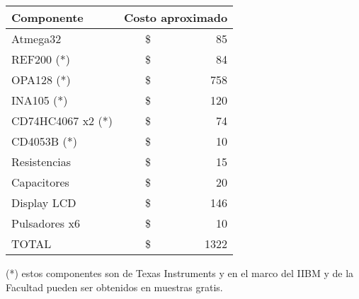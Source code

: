 \begin{table}[H]
\begin{center}
\begin{tabular}{|l|rr|}
    \hline
    \textbf{Componente} & \multicolumn{2}{c|}{\textbf{Costo aproximado}} \\ \hline
    Atmega32            & \hspace{2.8cm}\$ &   85 \\ \hline
    REF200 (*)          & \$               &   84 \\ \hline
    OPA128 (*)          & \$               &  758 \\ \hline
    INA105 (*)          & \$               &  120 \\ \hline
    CD74HC4067 x2 (*)   & \$               &   74 \\ \hline
    CD4053B (*)         & \$               &   10 \\ \hline
    Resistencias        & \$               &   15 \\ \hline
    Capacitores         & \$               &   20 \\ \hline
    Display LCD         & \$               &  146 \\ \hline
    Pulsadores x6       & \$               &   10 \\ \hline
    TOTAL               & \$               & 1322 \\ \hline
\end{tabular}
\end{center}
\end{table}

(*) estos componentes son de Texas Instruments y en el marco del IIBM y de la Facultad pueden ser obtenidos en muestras gratis.



